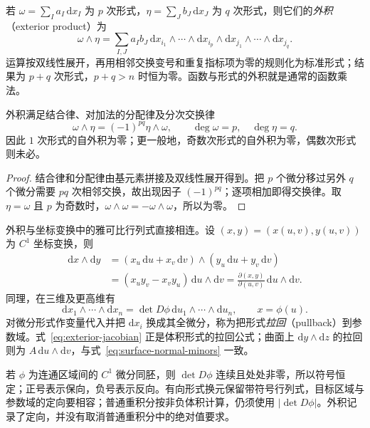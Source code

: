 \begin{definition}
\label{def:exterior-product}
若 $\omega=\sum_Ia_I\,\mathrm dx_I$ 为 $p$ 次形式，$\eta=\sum_Jb_J\,\mathrm dx_J$ 为 $q$ 次形式，则它们的\emph{外积}（exterior product）为
\[
    \omega\wedge\eta=\sum_{I,J}a_Ib_J\,
    \mathrm dx_{i_1}\wedge\cdots\wedge\mathrm dx_{i_p}
    \wedge\mathrm dx_{j_1}\wedge\cdots\wedge\mathrm dx_{j_q}.
\]
运算按双线性展开，再用相邻交换变号和重复指标项为零的规则化为标准形式；结果为 $p+q$ 次形式，$p+q>n$ 时恒为零。函数与形式的外积就是通常的函数乘法。
\end{definition}

\begin{proposition}
\label{prop:exterior-product-rules}
外积满足结合律、对加法的分配律及分次交换律
\[
    \omega\wedge\eta=(-1)^{pq}\eta\wedge\omega,
    \qquad \deg\omega=p,\quad\deg\eta=q.
\]
因此 $1$ 次形式的自外积为零；更一般地，奇数次形式的自外积为零，偶数次形式则未必。
\end{proposition}
\begin{proof}
结合律和分配律由基元素拼接及双线性展开得到。把 $p$ 个微分移过另外 $q$ 个微分需要 $pq$ 次相邻交换，故出现因子 $(-1)^{pq}$；逐项相加即得交换律。取 $\eta=\omega$ 且 $p$ 为奇数时，$\omega\wedge\omega=-\omega\wedge\omega$，所以为零。
\end{proof}

外积与坐标变换中的雅可比行列式直接相连。设 $(x,y)=(x(u,v),y(u,v))$ 为 $C^1$ 坐标变换，则
\begin{align*}
    \mathrm dx\wedge\mathrm dy
    &=(x_u\,\mathrm du+x_v\,\mathrm dv)\wedge(y_u\,\mathrm du+y_v\,\mathrm dv)\\
    &=(x_uy_v-x_vy_u)\,\mathrm du\wedge\mathrm dv
     =\frac{\partial(x,y)}{\partial(u,v)}\,\mathrm du\wedge\mathrm dv.
\end{align*}
同理，在三维及更高维有
\begin{equation}
\label{eq:exterior-jacobian}
    \mathrm dx_1\wedge\cdots\wedge\mathrm dx_n
    =\det D\phi\,\mathrm du_1\wedge\cdots\wedge\mathrm du_n,
    \qquad x=\phi(u).
\end{equation}
对微分形式作变量代入并把 $\mathrm dx_i$ 换成其全微分，称为把形式\emph{拉回}（pullback）到参数域。式~\eqref{eq:exterior-jacobian} 正是体积形式的拉回公式；曲面上 $\mathrm dy\wedge\mathrm dz$ 的拉回则为 $A\,\mathrm du\wedge\mathrm dv$，与式~\eqref{eq:surface-normal-minors} 一致。

若 $\phi$ 为连通区域间的 $C^1$ 微分同胚，则 $\det D\phi$ 连续且处处非零，所以符号恒定；正号表示保向，负号表示反向。有向形式换元保留带符号行列式，目标区域与参数域的定向要相容；普通重积分按非负体积计算，仍须使用 $|\det D\phi|$。外积记录了定向，并没有取消普通重积分中的绝对值要求。


